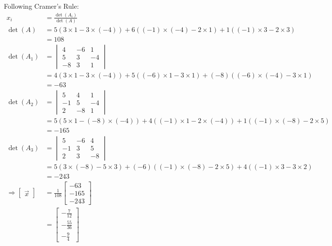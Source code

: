 \documentclass[11pt]{homework}
\begin{document}
Following Cramer's Rule:
\begin{align*}
x_i &= \frac{\det (A_i)}{\det (A)} \\
\det (A)  &= 5 (3 \times 1 - 3 \times(-4)) 
           + 6 ((-1) \times (-4) - 2 \times 1)
           + 1 ((-1) \times 3 - 2 \times 3) \\
          &= 108 \\
\det (A_1)&= 
  \begin{vmatrix}
  4 & -6 & 1 \\
  5 & 3 & -4 \\
  -8 & 3 & 1
  \end{vmatrix} \\
  &= 4 ( 3 \times 1 - 3 \times (-4))
   + 5 ( (-6) \times 1 - 3 \times 1)
   + (-8) ( (-6) \times (-4) - 3 \times 1)\\
  &= -63  \\
\det (A_2) &=
  \begin{vmatrix}
  5 & 4 & 1 \\
  -1 & 5 & -4 \\
  2 & -8 & 1
  \end{vmatrix} \\
  &= 5 ( 5 \times 1 - (-8) \times (-4))
   + 4 ( (-1) \times 1 - 2  \times (-4))
   + 1 ( (-1) \times (-8) - 2 \times 5) \\
  &= -165 \\
\det (A_3) &=
  \begin{vmatrix}
  5 & -6 & 4 \\
  -1 & 3 & 5 \\
  2 & 3 & -8
  \end{vmatrix} \\
  &= 5 ( 3 \times (-8) - 5 \times 3)
   + (-6) ((-1) \times (-8) - 2 \times 5)
   + 4 ( (-1) \times 3 - 3 \times 2) \\
  &= -243 \\
\Rightarrow
\begin{bmatrix}
  \vec x
\end{bmatrix}
 &=
  \frac{1}{108}
  \begin{bmatrix}
  -63 \\
  -165 \\
  -243 
  \end{bmatrix} \\
  &=
  \begin{bmatrix}
  -\frac{7}{12} \\
  -\frac{55}{36} \\
  -\frac{9}{4}
  \end{bmatrix}
\end{align*}
\end{document}
